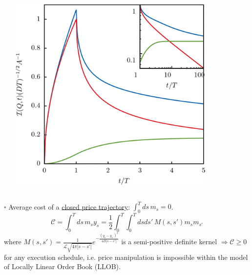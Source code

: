 \documentclass{beamer}
\begin{document}
\begin{frame}
{{\begin{columns}
\begin{column}{0.45\textwidth}
\end{column}
\begin{column}{0.45\textwidth}  %
    \begin{center}
     \includegraphics[width=0.85\textwidth,height=.35\textheight]{permanent}
    \end{center}
\end{column}
\begin{column}{0.5\textwidth}  %
\end{column}
\end{columns}


$\square$ Average cost of a \underline{closed price trajectory}: $\int_0^T ds\,m_s = 0$. 
$$
\mathcal{C} = \int_0^T ds\, m_s y_s = \frac{1}{2} \int_0^T \int_0^T ds ds'\,  M(s,s') m_s m_{s'}
$$
where
$
M(s,s') = \frac{1}{\mathcal{L}\sqrt{4\pi|s-s'|}}e^{-\frac{(y_s-y_{s'})^2}{4D|s-s'|}}
$
is a semi-positive definite kernel $\Rightarrow \mathcal{C}\ge 0$ for any execution schedule, i.e. price
manipulation is impossible within the model of Locally Linear Order Book (LLOB).
\newline
}


}
\end{frame}
\end{document}
